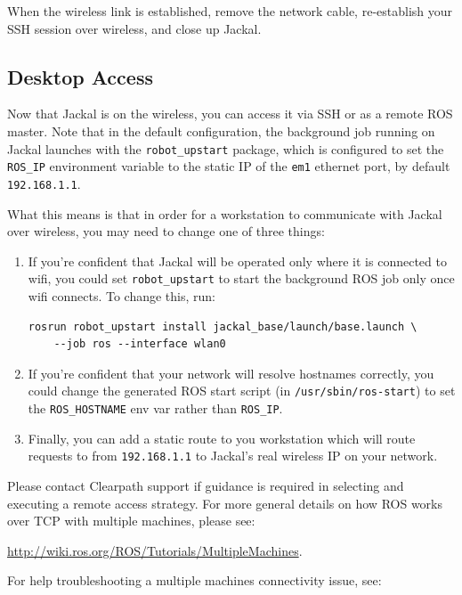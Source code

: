\documentclass[]{clearpath-manual}
\begin{document}
When the wireless link is established, remove the network cable, re-establish your SSH
session over wireless, and close up Jackal.

\subsection{Desktop Access}

Now that Jackal is on the wireless, you can access it via SSH or as a remote ROS master.
Note that in the default configuration, the background job running on Jackal launches with the 
\lstinline{robot_upstart} package, which is configured to set the \lstinline{ROS_IP}
environment variable to the static IP of the \lstinline{em1} ethernet port, by default
\lstinline{192.168.1.1}.

What this means is that in order for a workstation to communicate with Jackal over
wireless, you may need to change one of three things:

\begin{enumerate}
\item If you're confident that Jackal will be operated only where it is connected
to wifi, you could set \lstinline{robot_upstart} to start the background ROS job only
once wifi connects. To change this, run:
\begin{lstlisting}
rosrun robot_upstart install jackal_base/launch/base.launch \
    --job ros --interface wlan0
\end{lstlisting}

\item If you're confident that your network will resolve hostnames correctly, you could
change the generated ROS start script (in \lstinline{/usr/sbin/ros-start}) to set the
\lstinline{ROS_HOSTNAME} env var rather than \lstinline{ROS_IP}.

\item Finally, you can add a static route to you workstation which will route requests
to from \lstinline{192.168.1.1} to Jackal's real wireless IP on your network.
\end{enumerate}

Please contact Clearpath support if guidance is required in selecting and executing a
remote access strategy. For more general details on how ROS works over TCP with
multiple machines, please see:

\url{http://wiki.ros.org/ROS/Tutorials/MultipleMachines}.

For help troubleshooting a multiple machines connectivity issue, see:
\end{document}
